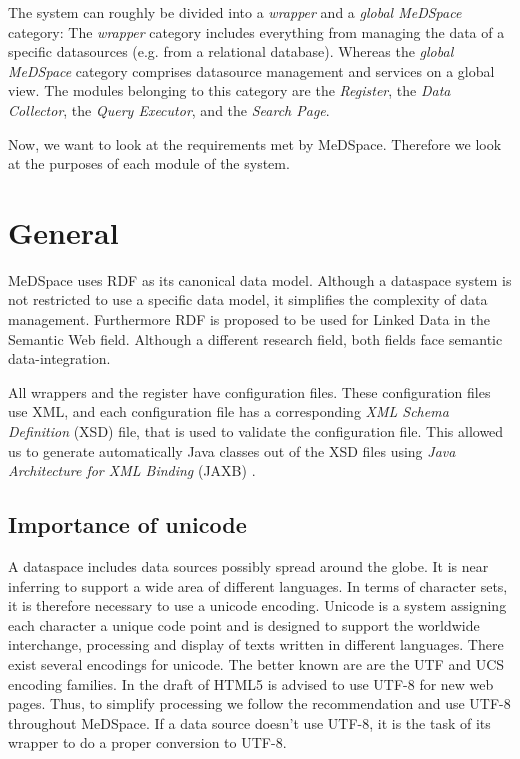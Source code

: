 The system can roughly be divided into a \emph{wrapper} and a \emph{global MeDSpace} category: The \emph{wrapper} category includes everything from managing the data of a specific datasources (e.g. from a relational database). 
Whereas the \emph{global MeDSpace} category comprises datasource management and services on a global view.  The modules belonging to this category are the \emph{Register}, the \emph{Data Collector}, the \emph{Query Executor}, and the \emph{Search Page}.  

Now, we want to look at the requirements met by MeDSpace. Therefore we look at the purposes of each module of the system.

\section{General} 
MeDSpace uses RDF \cite{w3RDF} as its canonical data model. Although a dataspace system is not restricted to use a specific data model, it simplifies the complexity of data management.
Furthermore RDF is proposed to be used for Linked Data \cite{LinkedData} in the Semantic Web field. Although a different research field, both fields face semantic data-integration.

All wrappers and the register have configuration files. These configuration files use XML, and each configuration file has a corresponding \emph{XML Schema Definition} (XSD)\cite{w3XMLSchema} file, that is used to validate the configuration file. This allowed us to generate automatically Java classes out of the XSD files using \emph{Java Architecture for XML Binding} (JAXB) \cite{JAXB}.


\subsection{Importance of unicode}

A dataspace includes data sources possibly spread around the globe. It is near inferring to support a wide area of different languages. In terms of character sets, it is therefore necessary to use a unicode encoding.
Unicode is a system assigning each character a unique code point and is designed to support the worldwide interchange, processing and display of texts written in different languages\cite{UnicodeStandard}.\newline
There exist several encodings for unicode. The better known are are the UTF and UCS encoding families. In the draft of HTML5 is advised to use UTF-8 for new web pages\cite{HTML5Rec}. 
Thus, to simplify processing we follow the recommendation and use UTF-8 throughout MeDSpace. If a data source doesn't use UTF-8, it is the task of its wrapper to do a proper conversion to UTF-8.

